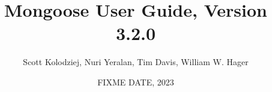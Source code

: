 \title{Mongoose User Guide, Version 3.2.0}
\author{Scott Kolodziej, Nuri Yeralan, Tim Davis, William W. Hager}
\date{FIXME DATE, 2023}
